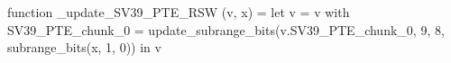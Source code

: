 function _update_SV39_PTE_RSW (v, x) = let v = { v with SV39_PTE_chunk_0 = update_subrange_bits(v.SV39_PTE_chunk_0, 9, 8, subrange_bits(x, 1, 0)) } in
  v
